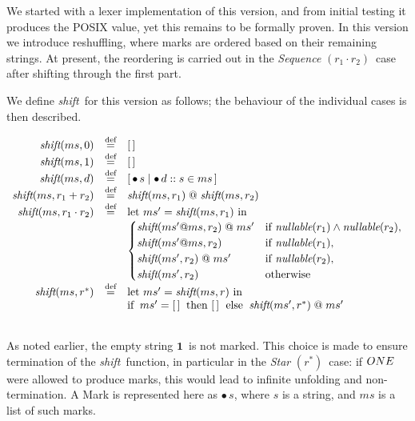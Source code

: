 \documentclass[12pt]{article}
\newcommand{\ONE}{\textbf{1}}
\newcommand{\shift}{\textit{shift}}
\newcommand{\Marked}[1]{\bullet\,#1}
\newcommand{\nullable}{\textit{nullable}}
\newcommand{\STARText}{\textit{Star} $(r^*)$}
\newcommand{\SEQText}{ \textit{Sequence} $(r_1 \cdot r_2)$}
\newcommand{\emptylist}{[\,]}
\begin{document}
We started with a lexer implementation of this version, and from initial testing it produces the POSIX value, 
yet this remains to be formally proven. 
In this version we introduce reshuffling, where marks are ordered based on their remaining strings. 
At present, the reordering is carried out in the \SEQText\ case after shifting through the first part.

We define \shift\ for this version as follows; the behaviour of the individual cases is then described.


\[
\begin{array}{rcl}
  \shift(ms, 0) 
    & \stackrel{\text{def}}{=} & \emptylist \\

  \shift(ms, 1) 
    & \stackrel{\text{def}}{=} & \emptylist \\

  \shift(ms, d) 
    & \stackrel{\text{def}}{=} & 
      [\, \Marked{s} \mid \Marked{d::s} \in ms \,] \\

  \shift(ms, r_1 + r_2) 
    & \stackrel{\text{def}}{=} & 
      \shift(ms, r_1) \; @ \; \shift(ms, r_2) \\

  \shift(ms, r_1 \cdot r_2) & \stackrel{\text{def}}{=} & \text{let } ms' = \shift(ms, r_1) \text{ in }\\
      & &\begin{cases}
        \shift(ms' @ ms, r_2) \; @ \; ms' & \text{if $\nullable(r_1) \land \nullable(r_2)$}, \\
        \shift(ms' @ ms, r_2)             & \text{if $\nullable(r_1)$}, \\
        \shift(ms', r_2) \; @ \; ms'      & \text{if $\nullable(r_2)$}, \\
        \shift(ms', r_2)                  & \text{otherwise}
      \end{cases} \\

  \shift(ms, r^{*}) & \stackrel{\text{def}}{=} &\text{let } ms' = \shift(ms, r) \text{ in }\\
                    &  & \text{if\;\;} ms' = \emptylist \;\; \text{then \emptylist \; else\;\;} \shift(ms', r^{*}) \; @ \; ms' \\
                   && 
      
\end{array}
\]

As noted earlier, the empty string $\ONE\,$ is not marked. 
This choice is made to ensure termination of the \shift\ function, in particular in the \STARText\ case: 
if $\\ONE\,$ were allowed to produce marks, this would lead to infinite unfolding and non-termination. 
A Mark is represented here as $\Marked{s}$, where $s$ is a string, and $ms$ is a list of such marks. 
\end{document}

